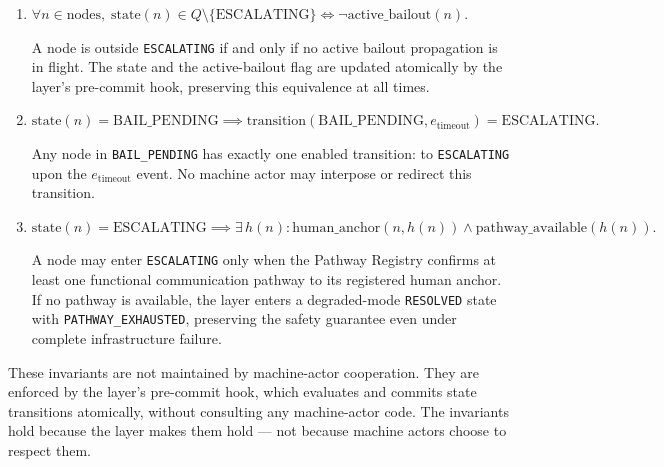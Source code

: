 \begin{enumerate}
\item[\textbf{INV-1.}] $\forall n \in \text{nodes},\; \text{state}(n) \in Q \setminus \{\text{ESCALATING}\} \iff \neg\text{active\_bailout}(n).$

A node is outside \texttt{ESCALATING} if and only if no active bailout propagation is in flight. The state and the active-bailout flag are updated atomically by the \fact{} layer's pre-commit hook, preserving this equivalence at all times.

\item[\textbf{INV-2.}] $\text{state}(n) = \text{BAIL\_PENDING} \implies \text{transition}(\text{BAIL\_PENDING}, e_{\text{timeout}}) = \text{ESCALATING}.$

Any node in \texttt{BAIL\_PENDING} has exactly one enabled transition: to \texttt{ESCALATING} upon the $e_{\text{timeout}}$ event. No machine actor may interpose or redirect this transition.

\item[\textbf{INV-3.}] $\text{state}(n) = \text{ESCALATING} \implies \exists\, h(n) : \text{human\_anchor}(n, h(n)) \land \text{pathway\_available}(h(n)).$

A node may enter \texttt{ESCALATING} only when the Pathway Registry confirms at least one functional communication pathway to its registered human anchor. If no pathway is available, the \fact{} layer enters a degraded-mode \texttt{RESOLVED} state with \texttt{PATHWAY\_EXHAUSTED}, preserving the safety guarantee even under complete infrastructure failure.
\end{enumerate}

These invariants are not maintained by machine-actor cooperation. They are enforced by the \fact{} layer's pre-commit hook, which evaluates and commits state transitions atomically, without consulting any machine-actor code. The invariants hold because the \fact{} layer makes them hold — not because machine actors choose to respect them.